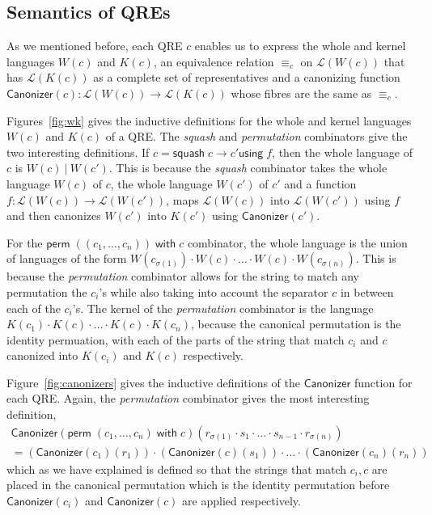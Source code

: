 \documentclass[acmsmall,review,anonymous]{acmart}
\newcommand{\kw}[1]{\ensuremath{\mathsf{#1}}}
\newcommand{\squash}[3]{\ensuremath{\kw{squash} \; #1 \rightarrow #2
\kw{using} \; #3}}
\newcommand{\perm}[2]{\ensuremath{\kw{perm}\; (#1)\; \kw{with}\; #2}}
\newcommand{\sep}{\ensuremath{\ | \ }}
\newcommand{\canonizer}{\ensuremath{\kw{Canonizer}}}
\newcommand{\eqrel}[1]{\ensuremath{\equiv_{#1}}}
\begin{document}
\subsection{Semantics of QREs}
As we mentioned before, each QRE $c$ enables us to express the whole and kernel
languages $W(c)$ and $K(c)$, an equivalence relation $\eqrel{c}$ on
$\mathcal{L}(W(c))$ that has $\mathcal{L}(K(c))$ as a complete set of
representatives and a canonizing function $\canonizer(c):\mathcal{L}(W(c))
\longrightarrow \mathcal{L}(K(c))$ whose fibres are the same as $\eqrel{c}$.

Figures~\ref{fig:wk} gives the inductive definitions for the whole and
kernel languages $W(c)$ and $K(c)$ of a QRE. The \textit{squash} and
\textit{permutation} combinators give the two interesting definitions. If $c =
\squash{c}{c'}{f}$, then the whole language of $c$ is $W(c) \sep W(c')$. This
is because the \textit{squash} combinator takes the whole language $W(c)$ of
$c$, the whole language $W(c')$ of $c'$ and a function $f : \mathcal{L}(W(c))
\longrightarrow \mathcal{L}(W(c'))$, maps $\mathcal{L}(W(c))$ into
$\mathcal{L}(W(c'))$ using $f$ and then canonizes $W(c')$ into $K(c')$ using
$\canonizer(c')$.

For the $\perm{(c_1, \ldots, c_n)}{c}$ combinator, the whole language is the
union of languages of the form $W(c_{\sigma(1)}) \cdot W(c) \cdot \ldots \cdot
W(c) \cdot W(c_{\sigma(n)})$. This is because the \textit{permutation}
combinator allows for the string to match any permutation the $c_i$'s while also
taking into account the separator $c$ in between each of the $c_i$'s. The kernel
of the \textit{permutation} combinator is the language $K(c_1) \cdot K(c) \cdot
\ldots \cdot K(c) \cdot K(c_n)$, because the canonical permutation is the
identity permuation, with each of the parts of the string that match $c_i$
and $c$ canonized into $K(c_i)$ and $K(c)$ respectively.

Figure~\ref{fig:canonizers} gives the inductive definitions of the
$\canonizer{}$ function for each QRE. Again, the \textit{permutation} combinator
gives the most interesting definition,
\begin{align*}\canonizer(\perm{c_1, \ldots, c_n}{c})(r_{\sigma(1)}
\cdot s_1 \cdot \ldots \cdot s_{n-1} \cdot r_{\sigma(n)}) \\
= (\canonizer(c_1)(r_1)) \cdot (\canonizer(c)(s_1)) \cdot \ldots \cdot
(\canonizer(c_n)(r_n))
\end{align*}
\noindent which as we have explained is defined so that the strings that match
$c_i, c$ are placed in the canonical permutation which is the identity
permutation before $\canonizer(c_i)$ and $\canonizer(c)$ are applied
respectively.
\end{document}
